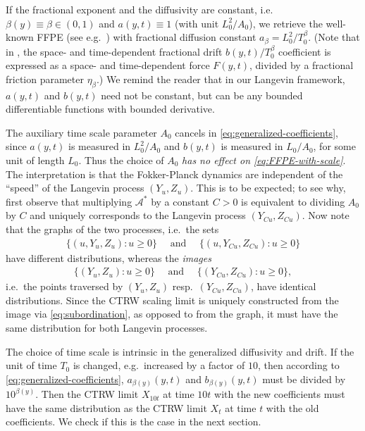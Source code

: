 \documentclass[a4paper,12pt]{elsarticle}
\numberwithin{equation}{section}
\theoremstyle{plain}
\theoremstyle{definition}
\theoremstyle{remark}
\numberwithin{equation}{section}
\newcommand{\1}{\mathbf 1}
\begin{document}
If the fractional exponent and the diffusivity are constant, i.e.\ 
$\beta(y) \equiv \beta \in (0,1)$ and $a(y,t) \equiv 1$ (with unit $L_0^2/A_0$),
we retrieve the well-known FFPE (see e.g.\ \cite[Eq.(3)]{HLS10PRL})
with fractional diffusion constant $a_\beta = L_0^2 / T_0^\beta$.
(Note that in \cite{HLS10PRL}, the space- and time-dependent fractional 
drift $b(y,t) / T_0^\beta$ coefficient is expressed as a space- and 
time-dependent force $F(y,t)$, divided by a fractional friction parameter 
$\eta_\beta$.)
We remind the reader that in our Langevin framework, $a(y,t)$ and 
$b(y,t)$ need not be constant, but can be any bounded differentiable 
functions with bounded derivative. 

The auxiliary time scale parameter 
$A_0$ cancels in \eqref{eq:generalized-coefficients}, since 
$a(y,t)$ is measured in $L_0^2 / A_0$ and $b(y,t)$ is measured in $L_0 / A_0$,
for some unit of length $L_0$. 
Thus the choice of $A_0$ \emph{has no effect on \eqref{eq:FFPE-with-scale}}.
The interpretation is that the
Fokker-Planck dynamics are independent of the ``speed'' of the Langevin process
$(Y_u, Z_u)$.  This is to be expected; to see why, first observe that
multiplying $\mathcal A^*$ by a constant $C > 0$ is equivalent to dividing 
$A_0$ by $C$ and uniquely corresponds to the
Langevin process $(Y_{Cu}, Z_{Cu})$. 
Now note that the graphs of the two processes, i.e.\ the sets
\begin{align*}
\{(u, Y_u, Z_u): u \ge 0\} \quad \text{ and } \quad 
\{(u, Y_{Cu}, Z_{Cu}): u \ge 0\}
\end{align*}
have different distributions, whereas the \emph{images}
\begin{align*}
\{(Y_u, Z_u): u \ge 0\} \quad \text{ and } \quad 
\{(Y_{Cu}, Z_{Cu}): u \ge 0\},
\end{align*}
i.e.\ the points traversed by $(Y_u,Z_u)$ resp.\ $(Y_{Cu}, Z_{Cu})$, 
have identical distributions. 
Since the CTRW scaling limit is uniquely constructed from the image via 
\eqref{eq:subordination},
as opposed to from the graph,
it must have the same distribution for both Langevin processes.

The choice of time scale is intrinsic in the generalized diffusivity and drift. 
If the unit of time $T_0$ is changed, e.g.\ increased by a factor of $10$, 
then according to \eqref{eq:generalized-coefficients}, 
$a_{\beta(y)}(y,t)$ and $b_{\beta(y)}(y,t)$ must be divided by 
$10^{\beta(y)}$. 
Then the CTRW limit $X_{10t}$ at time $10 t$ with the new coefficients must 
have the same distribution as the CTRW limit $X_t$ at time $t$ with the old 
coefficients. 
We check if this is the case in the next section. 
\end{document}
